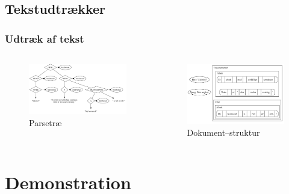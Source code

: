 \documentclass{beamer}
\begin{document}
\subsection{Tekstudtrækker}
\begin{frame}
  \frametitle{Udtræk af tekst}

  \begin{columns}[t]
    \begin{figure}
      \includegraphics[width=\textwidth]{parsetree.pdf}
      \caption{Parsetræ}
    \end{figure}

    \pause

    \begin{figure}
      \includegraphics[width=\textwidth]{documentill.pdf}
      \caption{Dokument--struktur}
    \end{figure}
  \end{columns}
\end{frame}


\section{Demonstration}
\end{document}
